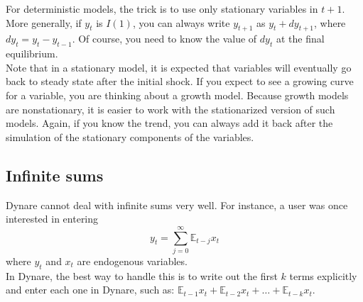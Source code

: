 For deterministic models, the trick is to use only stationary variables in $t+1$. More generally, if $y_t$ is $I(1)$, you can always write $y_{t+1}$ as $y_t+dy_{t+1}$, where $dy_t= y_t-y_{t-1}$. Of course, you need to know the value of $dy_t$ at the final equilibrium.\\

Note that in a stationary model, it is expected that variables will eventually go back to steady state after the initial shock. If you expect to see a growing curve for a variable, you are thinking about a growth model. Because growth models are nonstationary, it is easier to work with the stationarized version of such models. Again, if you know the trend, you can always add it back after the simulation of the stationary components of the variables. 

\subsection{Infinite sums}
Dynare cannot deal with infinite sums very well. For instance, a user was once interested in entering 
\[
y_t=\sum_{j=0}^{\infty} \mathbb{E}_{t-j}x_t
\]
where $y_t$ and $x_t$ are endogenous variables. \\

In Dynare, the best way to handle this is to write out the first $k$ terms explicitly and enter each one in Dynare, such as: $\mathbb{E}_{t-1}x_t + \mathbb{E}_{t-2}x_t+\ldots + \mathbb{E}_{t-k}x_t$.
